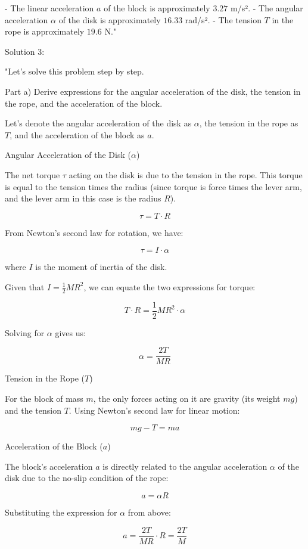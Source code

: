 - The linear acceleration \( a \) of the block is approximately \( 3.27 \) m/s².
- The angular acceleration \( \alpha \) of the disk is approximately \( 16.33 \) rad/s².
- The tension \( T \) in the rope is approximately \( 19.6 \) N."

Solution 3:

"Let's solve this problem step by step.

Part a) Derive expressions for the angular acceleration of the disk, the tension in the rope, and the acceleration of the block.

Let's denote the angular acceleration of the disk as \( \alpha \), the tension in the rope as \( T \), and the acceleration of the block as \( a \).

Angular Acceleration of the Disk (\( \alpha \))

The net torque \( \tau \) acting on the disk is due to the tension in the rope. This torque is equal to the tension times the radius (since torque is force times the lever arm, and the lever arm in this case is the radius \( R \)).

\[
\tau = T \cdot R
\]

From Newton's second law for rotation, we have:

\[
\tau = I \cdot \alpha
\]

where \( I \) is the moment of inertia of the disk.

Given that \( I = \frac{1}{2} M R^{2} \), we can equate the two expressions for torque:

\[
T \cdot R = \frac{1}{2} M R^{2} \cdot \alpha
\]

Solving for \( \alpha \) gives us:

\[
\alpha = \frac{2T}{M R}
\]

Tension in the Rope (\( T \))

For the block of mass \( m \), the only forces acting on it are gravity (its weight \( mg \)) and the tension \( T \). Using Newton's second law for linear motion:

\[
m g - T = m a
\]

Acceleration of the Block (\( a \))

The block's acceleration \( a \) is directly related to the angular acceleration \( \alpha \) of the disk due to the no-slip condition of the rope:

\[
a = \alpha R
\]

Substituting the expression for \( \alpha \) from above:

\[
a = \frac{2T}{M R} \cdot R = \frac{2T}{M}
\]

